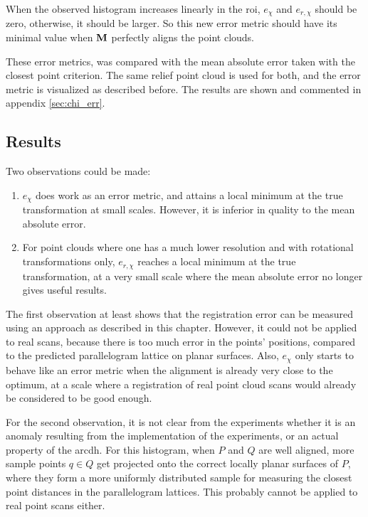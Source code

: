 When the observed histogram increases linearly in the \gls{roi}, $e_{\chi}$ and $e_{r,\chi}$ should be zero, otherwise, it should be larger. So this new error metric should have its minimal value when $\mathbf{M}$ perfectly aligns the point clouds.

These error metrics, was compared with the mean absolute error taken with the closest point criterion. The same relief point cloud is used for both, and the error metric is visualized as described before. The results are shown and commented in appendix \ref{sec:chi_err}.

\FloatBarrier


\subsection{Results}
Two observations could be made:
\begin{enumerate}
\item $e_{\chi}$ does work as an error metric, and attains a local minimum at the true transformation at small scales. However, it is inferior in quality to the mean absolute error.
\item For point clouds where one has a much lower resolution and with rotational transformations only, $e_{r,\chi}$ reaches a local minimum at the true transformation, at a very small scale where the mean absolute error no longer gives useful results.
\end{enumerate}

The first observation at least shows that the registration error can be measured using an approach as described in this chapter. However, it could not be applied to real scans, because there is too much error in the points' positions, compared to the predicted parallelogram lattice on planar surfaces. Also, $e_{\chi}$ only starts to behave like an error metric when the alignment is already very close to the optimum, at a scale where a registration of real point cloud scans would already be considered to be good enough.

For the second observation, it is not clear from the experiments whether it is an anomaly resulting from the implementation of the experiments, or an actual property of the \gls{arcdh}. For this histogram, when $P$ and $Q$ are well aligned, more sample points $q \in Q$ get projected onto the correct locally planar surfaces of $P$, where they form a more uniformly distributed sample for measuring the closest point distances in the parallelogram lattices. This probably cannot be applied to real point scans either.

